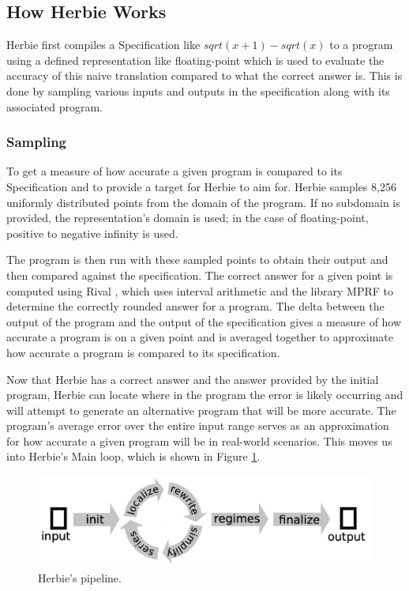 \documentclass{article}
\begin{document}
\subsection{How Herbie Works}
Herbie first compiles a Specification like $sqrt(x + 1) - sqrt(x)$ to a program using a defined representation like floating-point which is used to evaluate the accuracy of this naive translation compared to what the correct answer is. This is done by sampling various inputs and outputs in the specification along with its associated program.

\subsubsection{Sampling}

To get a measure of how accurate a given program is compared to its Specification and to provide a target for Herbie to aim for. Herbie samples 8,256 uniformly distributed points from the domain of the program. If no subdomain is provided, the representation’s domain is used; in the case of floating-point, positive to negative infinity is used.

The program is then run with these sampled points to obtain their output and then compared against the specification. The correct answer for a given point is computed using Rival \cite{Rival}, which uses interval arithmetic and the library MPRF \cite{MPFR} to determine the correctly rounded answer for a program. The delta between the output of the program and the output of the specification gives a measure of how accurate a program is on a given point and is averaged together to approximate how accurate a program is compared to its specification. 

Now that Herbie has a correct answer and the answer provided by the initial program, Herbie can locate where in the program the error is likely occurring and will attempt to generate an alternative program that will be more accurate. The program’s average error over the entire input range serves as an approximation for how accurate a given program will be in real-world scenarios. This moves us into Herbie’s Main loop, which is shown in Figure \ref{fig:herbie-pipeline}.

\begin{figure}[htbp]
\begin{center}
\includegraphics[scale=0.5]{herbie-pipeline.png}
\caption{Herbie's pipeline.}
\label{fig:herbie-pipeline}
\end{center}
\end{figure}
\end{document}
